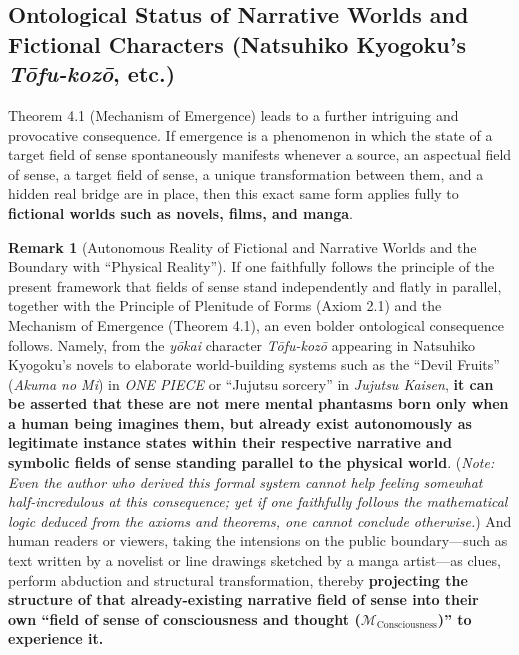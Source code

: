 \documentclass[11pt,a4paper]{article}
\theoremstyle{definition}
\newtheorem{remark}{Remark}[section]
\theoremstyle{plain}
\begin{document}
\subsection{Ontological Status of Narrative Worlds and Fictional Characters (Natsuhiko Kyogoku's \textit{T\=ofu-koz\=o}, etc.)}
Theorem 4.1 (Mechanism of Emergence) leads to a further intriguing and provocative consequence. If emergence is a phenomenon in which the state of a target field of sense spontaneously manifests whenever a source, an aspectual field of sense, a target field of sense, a unique transformation between them, and a hidden real bridge are in place, then this exact same form applies fully to \textbf{fictional worlds such as novels, films, and manga}.

\begin{remark}[Autonomous Reality of Fictional and Narrative Worlds and the Boundary with ``Physical Reality'']
If one faithfully follows the principle of the present framework that fields of sense stand independently and flatly in parallel, together with the Principle of Plenitude of Forms (Axiom 2.1) and the Mechanism of Emergence (Theorem 4.1), an even bolder ontological consequence follows. Namely, from the \textit{y\=okai} character \textit{T\=ofu-koz\=o} appearing in Natsuhiko Kyogoku's novels to elaborate world-building systems such as the ``Devil Fruits'' (\textit{Akuma no Mi}) in \textit{ONE PIECE} or ``Jujutsu sorcery'' in \textit{Jujutsu Kaisen}, \textbf{it can be asserted that these are not mere mental phantasms born only when a human being imagines them, but already exist autonomously as legitimate instance states within their respective narrative and symbolic fields of sense standing parallel to the physical world}. (\textit{Note: Even the author who derived this formal system cannot help feeling somewhat half-incredulous at this consequence; yet if one faithfully follows the mathematical logic deduced from the axioms and theorems, one cannot conclude otherwise.}) And human readers or viewers, taking the intensions on the public boundary---such as text written by a novelist or line drawings sketched by a manga artist---as clues, perform abduction and structural transformation, thereby \textbf{projecting the structure of that already-existing narrative field of sense into their own ``field of sense of consciousness and thought ($\mathcal{M}_{\mathrm{Consciousness}}$)'' to experience it.}


\end{remark}
\end{document}
